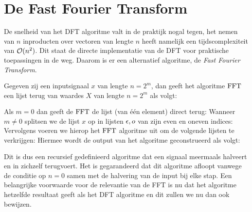 \section{De Fast Fourier Transform}
De snelheid van het DFT algoritme valt in de praktijk nogal tegen, het nemen van $n$ inproducten over vectoren
van lengte $n$ heeft namelijk een tijdscomplexiteit van $\mathcal{O}(n^2)$. Dit staat de directe implementatie van de DFT
voor praktische toepassingen in de weg. Daarom is er een alternatief algoritme, de \emph{Fast Fourier Transform}.  \bigskip

\begin{algo}
  Gegeven zij een inputsignaal $x$ van lengte $n=2^m$, dan geeft het algoritme $\text{FFT}$
  een lijst terug van waardes $X$ van lengte $n=2^m$ als volgt:

  Als $m=0$ dan geeft de $\text{FFT}$ de lijst (van \'e\'en element) direct terug:
  Wanneer $m\neq0$ splitsen we de lijst $x$ op in lijsten $\epsilon,o$ van zijn even en oneven indices:
  Vervolgens voeren we hierop het $\text{FFT}$ algoritme uit om de volgende lijsten te verkrijgen:
  Hiermee wordt de output van het algoritme geconstrueerd als volgt:
\end{algo}

Dit is dus een recursief gedefinieerd algoritme dat een signaal meermaals halveert en in zichzelf terugvoert.
Het is gegarandeerd dat dit algoritme afloopt vanwege de conditie op $n=0$ samen met de halvering van de input bij elke stap. Een belangrijke voorwaarde voor de relevantie van de FFT is nu dat het algoritme hetzelfde resultaat geeft als het DFT algoritme en dit zullen we nu dan ook bewijzen.

